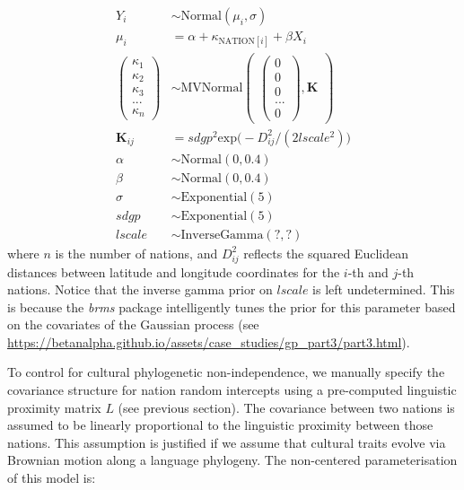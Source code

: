 \documentclass[
  man,floatsintext]{apa6}
\begin{document}
\[
\begin{aligned}
Y_{i} &\sim \text{Normal}(\mu_{i},\sigma) \\
\mu_{i} &= \alpha + \kappa_{\text{NATION}[i]} + \beta X_{i} \\
\begin{pmatrix}
\kappa_{1} \\ \kappa_{2} \\ \kappa_{3} \\ ... \\ \kappa_{n}
\end{pmatrix} &\sim \text{MVNormal}
\begin{pmatrix}
\begin{pmatrix}
0 \\ 0 \\ 0 \\ ... \\ 0
\end{pmatrix},\textbf{K}
\end{pmatrix}\\
\textbf{K}_{ij} &= sdgp^2 \text{exp} \big (-D_{ij}^2 / (2 lscale^2) \big )\\
\alpha &\sim \text{Normal}(0, 0.4) \\
\beta &\sim \text{Normal}(0, 0.4) \\
\sigma &\sim \text{Exponential}(5) \\
sdgp &\sim \text{Exponential}(5) \\
lscale &\sim \text{InverseGamma}(?,?)
\end{aligned}
\]
where \(n\) is the number of nations, and \(D^2_{ij}\) reflects the squared Euclidean distances between latitude and longitude coordinates for the \(i\)-th and \(j\)-th nations. Notice that the inverse gamma prior on \(lscale\) is left undetermined. This is because the \emph{brms} package intelligently tunes the prior for this parameter based on the covariates of the Gaussian process (see \url{https://betanalpha.github.io/assets/case_studies/gp_part3/part3.html}).

\newpage

To control for cultural phylogenetic non-independence, we manually specify the covariance structure for nation random intercepts using a pre-computed linguistic proximity matrix \(L\) (see previous section). The covariance between two nations is assumed to be linearly proportional to the linguistic proximity between those nations. This assumption is justified if we assume that cultural traits evolve via Brownian motion along a language phylogeny. The non-centered parameterisation of this model is:
\end{document}
